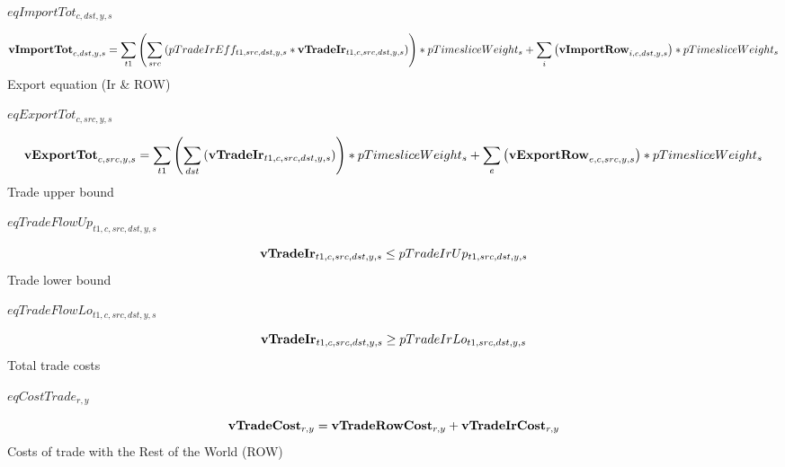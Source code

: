 \documentclass{article}
\begin{document}
$eqImportTot_{c,dst,y,s}$





\begin{dmath}
{\bf vImportTot}_{c,dst,y,s}  =  \sum_{t1}{\left(\sum_{src}{\left(pTradeIrEff_{t1,src,dst,y,s}*{\bf vTradeIr}_{t1,c,src,dst,y,s}\right)}\right)}*pTimesliceWeight_{s}+\sum_{i}{\left({\bf vImportRow}_{i,c,dst,y,s}\right)}*pTimesliceWeight_{s}
\end{dmath}
Export equation (Ir \& ROW)







$eqExportTot_{c,src,y,s}$





\begin{dmath}
{\bf vExportTot}_{c,src,y,s}  =  \sum_{t1}{\left(\sum_{dst}{\left({\bf vTradeIr}_{t1,c,src,dst,y,s}\right)}\right)}*pTimesliceWeight_{s}+\sum_{e}{\left({\bf vExportRow}_{e,c,src,y,s}\right)}*pTimesliceWeight_{s}
\end{dmath}
Trade upper bound







$eqTradeFlowUp_{t1,c,src,dst,y,s}$





\begin{dmath}
{\bf vTradeIr}_{t1,c,src,dst,y,s}  \le  pTradeIrUp_{t1,src,dst,y,s}
\end{dmath}
Trade lower bound







$eqTradeFlowLo_{t1,c,src,dst,y,s}$





\begin{dmath}
{\bf vTradeIr}_{t1,c,src,dst,y,s}  \ge  pTradeIrLo_{t1,src,dst,y,s}
\end{dmath}
Total trade costs







$eqCostTrade_{r,y}$





\begin{dmath}
{\bf vTradeCost}_{r,y}  =  {\bf vTradeRowCost}_{r,y}+{\bf vTradeIrCost}_{r,y}
\end{dmath}
Costs of trade with the Rest of the World (ROW)
\end{document}
